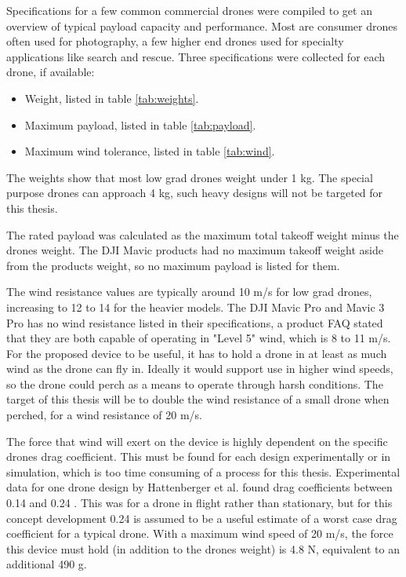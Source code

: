 \documentclass{article}
\begin{document}
Specifications for a few common commercial drones were compiled to get an overview of typical payload capacity and performance.
Most are consumer drones often used for photography, a few higher end drones used for specialty applications like search and rescue.
Three specifications were collected for each drone, if available:
\begin{itemize}
    \item Weight, listed in table \ref{tab:weights}.
    \item Maximum payload, listed in table \ref{tab:payload}.
    \item Maximum wind tolerance, listed in table \ref{tab:wind}.
\end{itemize}

The weights show that most low grad drones weight under 1 kg. The special purpose drones can approach 4 kg, such heavy designs will not be targeted for this
thesis.

The rated payload was calculated as the maximum total takeoff weight minus the drones weight. The DJI Mavic products had no maximum takeoff weight aside from 
the products weight, so no maximum payload is listed for them. 

The wind resistance values are typically around 10 m/s for low grad drones, increasing to 12 to 14 for the heavier models. The DJI Mavic Pro and Mavic 3 Pro
has no wind resistance listed in their specifications, a product FAQ stated that they are both capable of operating in "Level 5" wind, which is 8 to 11 m/s.
For the proposed device to be useful, it has to hold a drone in at least as much wind as the drone can fly in. Ideally it would support use in higher wind speeds, 
so the drone could perch as a means to operate through harsh conditions. The target of this thesis will be to double the wind resistance of a small drone when perched,
for a wind resistance of 20 m/s.

The force that wind will exert on the device is highly dependent on the specific drones drag coefficient. This must be found for each design experimentally or in
simulation, which is too time consuming of a process for this thesis. Experimental data for one drone design by Hattenberger et al.
found drag coefficients between 0.14 and 0.24 \cite{hattenberger_evaluation_2023}. This was for a drone in flight rather than stationary, but for this 
concept development 0.24 is assumed to be a useful estimate of a worst case drag coefficient for a typical drone. With a maximum wind speed of 20 m/s, 
the force this device must hold (in addition to the drones weight) is 4.8 N, equivalent to an additional 490 g.
\end{document}
